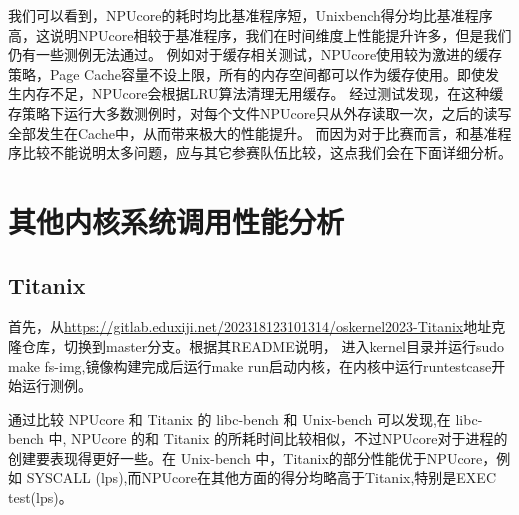 我们可以看到，NPUcore的耗时均比基准程序短，Unixbench得分均比基准程序高，这说明NPUcore相较于基准程序，我们在时间维度上性能提升许多，但是我们仍有一些测例无法通过。
例如对于缓存相关测试，NPUcore使用较为激进的缓存策略，Page Cache容量不设上限，所有的内存空间都可以作为缓存使用。即使发生内存不足，NPUcore会根据LRU算法清理无用缓存。
经过测试发现，在这种缓存策略下运行大多数测例时，对每个文件NPUcore只从外存读取一次，之后的读写全部发生在Cache中，从而带来极大的性能提升。
而因为对于比赛而言，和基准程序比较不能说明太多问题，应与其它参赛队伍比较，这点我们会在下面详细分析。

\section{其他内核系统调用性能分析}


\subsection{Titanix}

首先，从\href{https://gitlab.eduxiji.net/202318123101314/oskernel2023-Titanix}{https://gitlab.eduxiji.net/202318123101314/oskernel2023-Titanix}地址克隆仓库，切换到master分支。根据其README说明，
进入kernel目录并运行sudo make fs-img,镜像构建完成后运行make run启动内核，在内核中运行runtestcase开始运行测例。



通过比较 NPUcore 和 Titanix 的 libc-bench 和 Unix-bench 可以发现,在 libc-bench 中,
NPUcore 的和 Titanix 的所耗时间比较相似，不过NPUcore对于进程的创建要表现得更好一些。在 Unix-bench 中，Titanix的部分性能优于NPUcore，例如
SYSCALL (lps),而NPUcore在其他方面的得分均略高于Titanix,特别是EXEC test(lps)。

